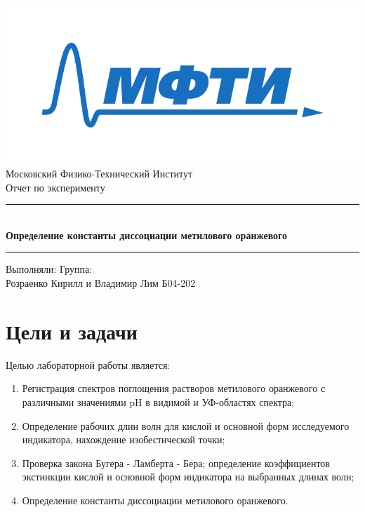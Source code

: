 \documentclass[a4paper,12pt]{article}
\begin{document}
\begin{titlepage}
		\vspace*{\fill}
		
		\begin{center}
			\includegraphics[scale=0.8]{MIPT.pdf}
			\\[0.7cm]\Huge Московский Физико-Технический Институт
			\\[2cm]\LARGE Отчет по эксперименту
			\\[0.5cm]\noindent\rule{\textwidth}{1pt}
			\\\Huge\textbf{Определение константы диссоциации метилового оранжевого}
			\\[-0.5cm]\noindent\rule{\textwidth}{1pt}
		\end{center}
		
		\vspace*{\fill}
		
		\begin{flushleft}
			Выполняли: \hspace{\fill} Группа:
			\\Розраенко Кирилл и Владимир Лим \hspace{\fill} Б04-202
		\end{flushleft}
	\end{titlepage}

	\setcounter{page}{2}
\section*{Цели и задачи}
Целью лабораторной работы является:
\begin{enumerate}
    \item Регистрация спектров поглощения растворов метилового оранжевого с различными
значениями pH в видимой и УФ-областях спектра;
    \item Определение рабочих длин волн для кислой и основной форм исследуемого
индикатора, нахождение изобестической точки;
    \item Проверка закона Бугера - Ламберта - Бера; определение коэффициентов экстинкции
кислой и основной форм индикатора на выбранных длинах волн;
    \item Определение константы диссоциации метилового оранжевого.
\end{enumerate}
\end{document}
